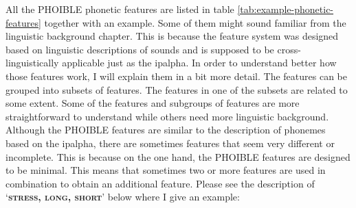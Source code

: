 All the PHOIBLE phonetic features are listed in table \ref{tab:example-phonetic-features} together with an example. Some of them might sound familiar from the linguistic background chapter. This is because the feature system was designed based on linguistic descriptions of sounds and is supposed to be cross-linguistically applicable just as the \ac{ipalpha}. In order to understand better how those features work, I will explain them in a bit more detail. The features can be grouped into subsets of features. The features in one of the subsets are related to some extent. Some of the features and subgroups of features are more straightforward to understand while others need more linguistic background. Although the PHOIBLE features are similar to the description of phonemes based on the \ac{ipalpha}, there are sometimes features that seem very different or incomplete. This is because on the one hand, the PHOIBLE features are designed to be minimal. This means that sometimes two or more features are used in combination to obtain an additional feature. Please see the description of `\textsc{\textbf{stress, long, short}}' below where I give an example:


